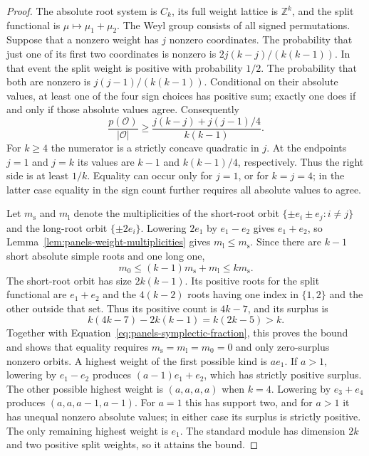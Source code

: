 \begin{proof}
The absolute root system is $C_k$, its full weight lattice is
$\mathbb Z^k$, and the split functional is
$\mu\mapsto\mu_1+\mu_2$. The Weyl group consists of all signed
permutations. Suppose that a nonzero weight has $j$ nonzero
coordinates. The probability that just one of its first two
coordinates is nonzero is $2j(k-j)/(k(k-1))$. In that event the
split weight is positive with probability $1/2$. The probability
that both are nonzero is $j(j-1)/(k(k-1))$. Conditional on their
absolute values, at least one of the four sign choices has positive
sum; exactly one does if and only if those absolute values agree.
Consequently
\begin{equation}\label{eq:panels-symplectic-fraction}
 \frac{p(\mathcal O)}{|\mathcal O|}
 \geq\frac{j(k-j)+j(j-1)/4}{k(k-1)}.
\end{equation}
For $k\geq4$ the numerator is a strictly concave quadratic in
$j$. At the endpoints $j=1$ and $j=k$ its values are $k-1$
and $k(k-1)/4$, respectively. Thus the right side is at least
$1/k$. Equality can occur only for $j=1$, or for $k=j=4$;
in the latter case equality in the sign count further requires all
absolute values to agree.

Let $m_{\mathrm s}$ and $m_{\mathrm l}$ denote the
multiplicities of the short-root orbit
$\{\pm e_i\pm e_j:i\neq j\}$ and the long-root orbit
$\{\pm2e_i\}$. Lowering $2e_1$ by $e_1-e_2$ gives
$e_1+e_2$, so Lemma~\ref{lem:panels-weight-multiplicities}
gives $m_{\mathrm l}\leq m_{\mathrm s}$. Since there are
$k-1$ short absolute simple roots and one long one,
\[
 m_0\leq(k-1)m_{\mathrm s}+m_{\mathrm l}
       \leq k m_{\mathrm s}.
\]
The short-root orbit has size $2k(k-1)$. Its positive roots for
the split functional are $e_1+e_2$ and the $4(k-2)$ roots having
one index in $\{1,2\}$ and the other outside that set. Thus its
positive count is $4k-7$, and its surplus is
\[
 k(4k-7)-2k(k-1)=k(2k-5)>k.
\]
Together with Equation~\eqref{eq:panels-symplectic-fraction},
this proves the bound and shows that equality requires
$m_{\mathrm s}=m_{\mathrm l}=m_0=0$ and only zero-surplus
nonzero orbits. A highest weight of the first possible kind is
$a e_1$. If $a>1$, lowering by $e_1-e_2$ produces
$(a-1)e_1+e_2$, which has strictly positive surplus. The other
possible highest weight is $(a,a,a,a)$ when $k=4$. Lowering by
$e_3+e_4$ produces $(a,a,a-1,a-1)$. For $a=1$ this has
support two, and for $a>1$ it has unequal nonzero absolute values;
in either case its surplus is strictly positive. The only remaining
highest weight is $e_1$. The standard module has dimension $2k$
and two positive split weights, so it attains the bound.


\end{proof}
